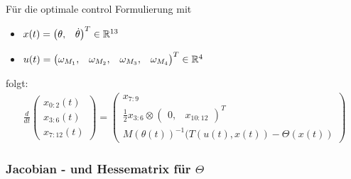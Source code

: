 Für die optimale control Formulierung mit \\
\begin{itemize}
\item $x(t) =\left(\begin{matrix} \theta, &\dot \theta \end{matrix}\right)^T \in \mathbb{R}^{13}$
\item $u(t) =\left(\begin{matrix} \omega_{M_1}, &\omega_{M_2}, &\omega_{M_3}, &\omega_{M_4} \end{matrix}\right)^T \in \mathbb{R}^{4}$
\end{itemize}
folgt:
\begin{align}
\frac{d}{dt} 
  \left(
      \begin{matrix}
          x_{0:2}(t) \\
          x_{3:6}(t) \\
          x_{7:12}(t)  
      \end{matrix}
  \right)
  = 
  \left(
      \begin{matrix}
          x_{7:9} \\
          \frac{1}{2} x_{3:6} \otimes \left(\begin{matrix} 0, & x_{10:12} \end{matrix}\right)^T\\
          M(\theta(t))^{-1} (T(u(t), x(t)) - \Theta(x(t))
      \end{matrix}
  \right)
\end{align}

\subsubsection{Jacobian - und Hessematrix für $\Theta$}























